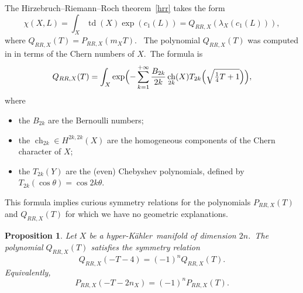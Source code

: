 \documentclass[12pt]{amsart}
\DeclareMathOperator{\ch}{ch}
\DeclareMathOperator{\td}{td}
\def\hk{hyper-K\"ahler}
\newtheorem{prop}[lemm]{Proposition}
\theoremstyle{remark}
\begin{document}

The Hirzebruch--Riemann--Roch theorem~\eqref{hrr}   takes the form 
\begin{equation}\label{hrrq}
\chi(X,L)=\int_X\td(X)\exp (c_1(L))=Q_{RR,X}(\lambda_X(c_1(L))) ,
\end{equation}
where $Q_{RR,X}(T)=P_{RR,X}(m_XT)$.\ 
%
The polynomial $Q_{RR,X}(T)$ was computed in \cite[Theorem~5.2]{nw} in terms of the Chern numbers of $X$.\  The formula is
\begin{equation}\label{nwiss}
Q_{RR,X}(T) = \int_X \exp\Bigl(-\sum_{k=1}^{+\infty}\frac{B_{2k}}{2k}  \ch_{2k}(X)T_{2k}\Bigl(\sqrt{\tfrac14T+1}\Bigr)\Bigr),
\end{equation}
where
\begin{itemize}
\item the $B_{2k}$ are the Bernoulli numbers;
\item the $\ch_{2k}\in H^{2k,2k}(X)$ are the homogeneous components of the Chern character of $X$;
\item the $T_{2k}(Y)$ are the (even) Chebyshev polynomials, defined by $T_{2k}( \cos \theta)=\cos 2k \theta$.
\end{itemize}

\bigskip
 
This formula implies curious symmetry relations for the  polynomials $P_{RR,X}(T)$ and $Q_{RR,X}(T)$ for which we have no geometric explanations.

\begin{prop}\label{prop15}
Let $X$ be a \hk\ manifold of dimension $2n$.\  The polynomial $Q_{RR,X}(T)$  satisfies the symmetry relation 
\begin{equation}\label{symm}
Q_{RR,X}(-T-4)=(-1)^n Q_{RR,X}(T).
\end{equation}
Equivalently, 
\begin{equation}\label{symmp}
P_{RR,X}(-T-2n_X)=(-1)^n P_{RR,X}(T).
\end{equation}
\end{prop}
\end{document}
